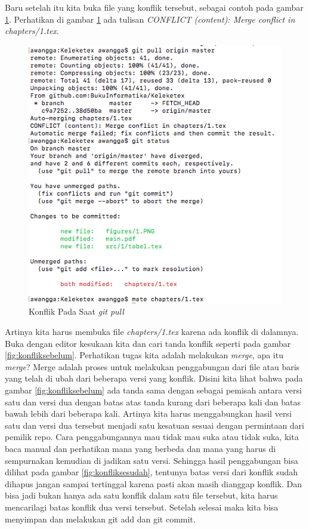 Baru setelah itu kita buka file yang konflik tersebut, sebagai contoh pada gambar \ref{fig:fileyangkonflik}. Perhatikan di gambar \ref{fig:fileyangkonflik} ada tulisan \textit{CONFLICT (content): Merge conflict in chapters/1.tex}.

\begin{figure}[!htbp]
\centerline{\includegraphics[width=.75\textwidth]{Figures/fileyangkonflik}}
\caption{Konflik Pada Saat \textit{git pull}}
\label{fig:fileyangkonflik}
\end{figure}

Artinya kita harus membuka file \textit{chapters/1.tex} karena ada konflik di dalamnya. Buka dengan editor kesukaan kita dan cari tanda konflik seperti pada gambar \ref{fig:konfliksebelum}. Perhatikan tugas kita adalah melakukan \textit{merge}, apa itu \textit{merge}? Merge adalah proses untuk melakukan penggabungan dari file atau baris yang telah di ubah dari beberapa versi yang konflik. Disini kita lihat bahwa pada gambar \ref{fig:konfliksebelum} ada tanda sama dengan sebagai pemisah antara versi satu dan versi dua dengan batas atas tanda kurang dari beberapa kali dan batas bawah lebih dari beberapa kali. Artinya kita harus menggabungkan hasil versi satu dan versi dua tersebut menjadi satu kesatuan sesuai dengan permintaan dari pemilik repo. Cara penggabungannya mau tidak mau suka atau tidak suka, kita baca manual dan perhatikan mana yang berbeda dan mana yang harus di sempurnakan kemudian di jadikan satu versi. Sehingga hasil penggabungan bisa dilihat pada gambar \ref{fig:konfliksesudah}, tentunya batas versi dari konflik sudah dihapus jangan sampai tertinggal karena pasti akan masih dianggap konflik. Dan bisa jadi bukan hanya ada satu konflik dalam satu file tersebut, kita harus mencarilagi batas konflik dua versi tersebut. Setelah selesai maka kita bisa menyimpan dan melakukan git add dan git commit.


